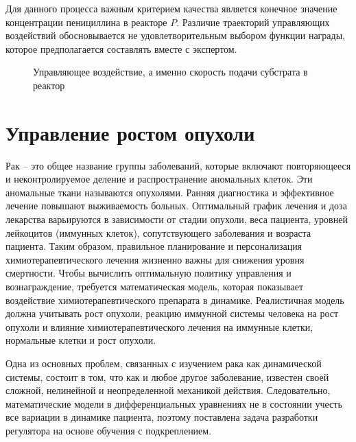 Для данного процесса важным критерием качества является конечное значение концентрации пенициллина в реакторе $P$. Различие траекторий управляющих воздействий  обосновывается не удовлетворительным выбором функции награды, которое предполагается составлять вместе с экспертом. 
\begin{figure}[ht!]
	\caption{Управляющее воздействие, а именно скорость подачи субстрата в реактор}
	\label{fig:u_penicillin-ch3}
\end{figure}


\section{Управление ростом опухоли}\label{ch3:sec2}
%
Рак -- это общее название группы заболеваний, которые включают повторяющееся и неконтролируемое деление и распространение аномальных клеток. Эти аномальные ткани называются опухолями. Ранняя диагностика и эффективное лечение повышают выживаемость больных. Оптимальный график лечения и доза лекарства варьируются в зависимости от стадии опухоли, веса пациента, уровней лейкоцитов (иммунных клеток), сопутствующего заболевания и возраста пациента. Таким образом, правильное планирование и персонализация химиотерапевтического лечения жизненно важны для снижения уровня смертности. 
Чтобы вычислить оптимальную политику управления и вознаграждение, требуется математическая модель, которая показывает воздействие химиотерапевтического препарата в динамике. Реалистичная модель должна учитывать рост опухоли, реакцию иммунной системы человека на рост опухоли и влияние химиотерапевтического лечения на иммунные клетки, нормальные клетки и рост опухоли.

Одна из основных проблем, связанных с изучением рака как динамической системы, состоит в том, что как и любое другое заболевание, известен своей сложной, нелинейной и неопределенной механикой действия. Следовательно, математические модели в дифференциальных уравнениях не в состоянии учесть все вариации в динамике пациента, поэтому поставлена задача разработки регулятора на основе обучения с подкреплением.


